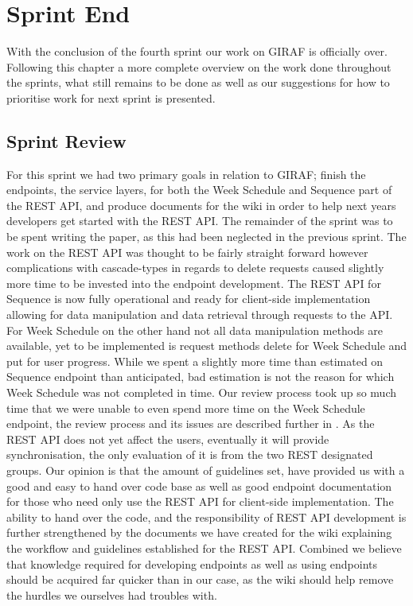 \chapter{Sprint End}
With the conclusion of the fourth sprint our work on GIRAF is officially over.
Following this chapter a more complete overview on the work done throughout the sprints, what still remains to be done as well as our suggestions for how to prioritise work for next sprint is presented.

\section{Sprint Review}
For this sprint we had two primary goals in relation to GIRAF; finish the endpoints, the service layers, for both the Week Schedule and Sequence part of the REST API, and produce documents for the wiki in order to help next years developers get started with the REST API.
The remainder of the sprint was to be spent writing the paper, as this had been neglected in the previous sprint.
The work on the REST API was thought to be fairly straight forward however complications with cascade-types in regards to delete requests caused slightly more time to be invested into the endpoint development.
The REST API for Sequence is now fully operational and ready for client-side implementation allowing for data manipulation and data retrieval through requests to the API.
For Week Schedule on the other hand not all data manipulation methods are available, yet to be implemented is request methods delete for Week Schedule and put for user progress.
While we spent a slightly more time than estimated on Sequence endpoint than anticipated, bad estimation is not the reason for which Week Schedule was not completed in time.
Our review process took up so much time that we were unable to even spend more time on the Week Schedule endpoint, the review process and its issues are described further in .
As the REST API does not yet affect the users, eventually it will provide synchronisation, the only evaluation of it is from the two REST designated groups.
Our opinion is that the amount of guidelines set, have provided us with a good and easy to hand over code base as well as good endpoint documentation for those who need only use the REST API for client-side implementation.
The ability to hand over the code, and the responsibility of REST API development is further strengthened by the documents we have created for the wiki explaining the workflow and guidelines established for the REST API.
Combined we believe that knowledge required for developing endpoints as well as using endpoints should be acquired far quicker than in our case, as the wiki should help remove the hurdles we ourselves had troubles with.
